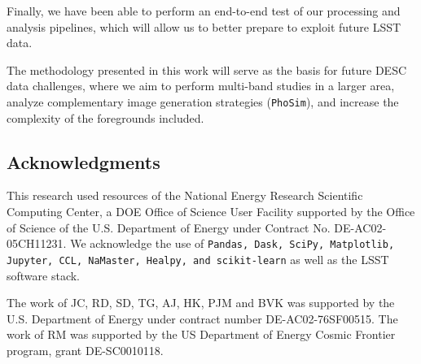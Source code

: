 \documentclass[twocolumn]{aastex62}
\begin{document}
Finally, we have been able to perform an end-to-end test of our processing and analysis pipelines, which will allow us to better prepare to exploit future LSST data.

The methodology presented in this work will serve as the basis for future DESC data challenges, where we aim to perform multi-band studies in a larger area, analyze complementary image generation strategies (\texttt{PhoSim}), and increase the complexity of the foregrounds included.


\subsection*{Acknowledgments}

This research used resources of the National Energy Research Scientific Computing Center, a DOE Office of Science User Facility supported by the Office of Science of the U.S. Department of Energy under Contract No. DE-AC02-05CH11231. We acknowledge the use of \texttt{Pandas, Dask, SciPy, Matplotlib, Jupyter, CCL, NaMaster, Healpy, and scikit-learn} as well as the LSST software stack.

The work of JC, RD, SD, TG, AJ, HK, PJM and BVK was supported by the U.S. Department of Energy under contract number DE-AC02-76SF00515. 
The work of RM was supported by the US Department of Energy Cosmic Frontier program, grant DE-SC0010118.




\end{document}
